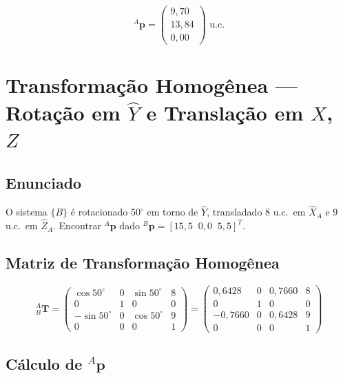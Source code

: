 \documentclass[12pt,a4paper]{article}
\newcommand{\Trans}[2]{{}^{#1}_{#2}\!\mathbf{T}}
\newcommand{\degr}{^{\circ}}
\begin{document}
\begin{tcolorbox}[resultbox]
\[
  {}^{A}\mathbf{p} =
  \begin{pmatrix} 9{,}70 \\ 13{,}84 \\ 0{,}00 \end{pmatrix} \text{ u.c.}
\]
\end{tcolorbox}

\newpage

\section{Transformação Homogênea --- Rotação em $\hat{Y}$ e Translação em $X$, $Z$}

\subsection*{Enunciado}
O sistema $\{B\}$ é rotacionado $50\degr$ em torno de $\hat{Y}$, transladado $8$ u.c.\ em $\hat{X}_A$ e $9$ u.c.\ em $\hat{Z}_A$.
Encontrar ${}^{A}\mathbf{p}$ dado ${}^{B}\mathbf{p} = [15{,}5\;\;0{,}0\;\;5{,}5]^T$.

\subsection{Matriz de Transformação Homogênea}

\[
\Trans{A}{B} =
\begin{pmatrix}
  \cos 50\degr  & 0 & \sin 50\degr & 8 \\
  0             & 1 & 0            & 0 \\
  -\sin 50\degr & 0 & \cos 50\degr & 9 \\
  0             & 0 & 0            & 1
\end{pmatrix}
=
\begin{pmatrix}
  0{,}6428  & 0 & 0{,}7660 & 8 \\
  0         & 1 & 0        & 0 \\
 -0{,}7660  & 0 & 0{,}6428 & 9 \\
  0         & 0 & 0        & 1
\end{pmatrix}
\]

\subsection{Cálculo de ${}^{A}\mathbf{p}$}
\end{document}
